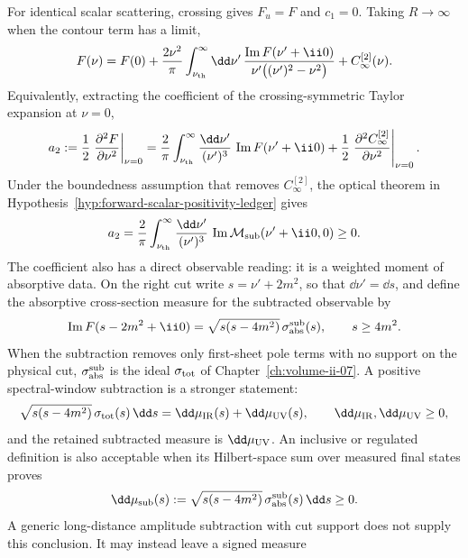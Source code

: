 For identical scalar scattering, crossing gives \(F_u=F\) and \(c_1=0\).  Taking
\(R\to\infty\) when the contour term has a limit,
\begin{equation}
  F(\nu)
  =
  F(0)
  +
  \frac{2\nu^2}{\pi}
  \int_{\nu_{\rm th}}^\infty
  \dd\nu'\,
  \frac{\operatorname{Im}F(\nu'+\ii0)}
       {\nu'\bigl((\nu')^2-\nu^2\bigr)}
  +
  C_\infty^{[2]}(\nu).
\label{eq:forward-crossing-even-dispersion}
\end{equation}
Equivalently, extracting the coefficient of the crossing-symmetric Taylor
expansion at \(\nu=0\),
\begin{equation}
  a_2
  :=
  \frac12\left.
  \frac{\partial^2 F}{\partial\nu^2}
  \right|_{\nu=0}
  =
  \frac{2}{\pi}
  \int_{\nu_{\rm th}}^\infty
  \frac{\dd\nu'}{(\nu')^3}\,
  \operatorname{Im}F(\nu'+\ii0)
  +
  \frac12\left.
  \frac{\partial^2 C_\infty^{[2]}}{\partial\nu^2}
  \right|_{\nu=0}.
\label{eq:forward-positivity-a2-sum-rule}
\end{equation}
Under the boundedness assumption that removes \(C_\infty^{[2]}\), the optical
theorem in Hypothesis~\ref{hyp:forward-scalar-positivity-ledger} gives
\begin{equation}
  a_2
  =
  \frac{2}{\pi}
  \int_{\nu_{\rm th}}^\infty
  \frac{\dd\nu'}{(\nu')^3}\,
  \operatorname{Im}\mathcal M_{\rm sub}(\nu'+\ii0,0)
  \ge0 .
\label{eq:forward-scalar-positivity-bound}
\end{equation}
The coefficient also has a direct observable reading: it is a weighted moment
of absorptive data.  On the right cut write \(s=\nu'+2m^2\), so that
\(\dd\nu'=\dd s\), and define the absorptive cross-section measure for the
subtracted observable by
\[
  \operatorname{Im}F(s-2m^2+\ii0)
  =
  \sqrt{s(s-4m^2)}\,\sigma_{\rm abs}^{\rm sub}(s),
  \qquad s\ge4m^2 .
\]
When the subtraction removes only first-sheet pole terms with no support on the
physical cut, \(\sigma_{\rm abs}^{\rm sub}\) is the ideal
\(\sigma_{\rm tot}\) of Chapter~\ref{ch:volume-ii-07}.  A positive
spectral-window subtraction is a stronger statement:
\[
  \sqrt{s(s-4m^2)}\,\sigma_{\rm tot}(s)\,\dd s
  =
  \dd\mu_{\rm IR}(s)+\dd\mu_{\rm UV}(s),
  \qquad
  \dd\mu_{\rm IR},\dd\mu_{\rm UV}\ge0,
\]
and the retained subtracted measure is \(\dd\mu_{\rm UV}\).  An inclusive or
regulated definition is also acceptable when its Hilbert-space sum over
measured final states proves
\[
  \dd\mu_{\rm sub}(s)
  :=
  \sqrt{s(s-4m^2)}\,\sigma_{\rm abs}^{\rm sub}(s)\,\dd s
  \ge0 .
\]
A generic long-distance amplitude subtraction with cut support does not supply
this conclusion.  It may instead leave a signed measure
